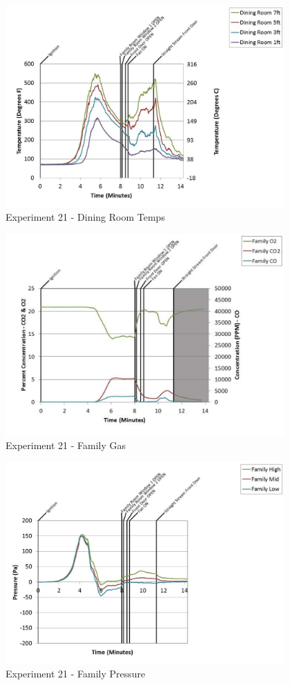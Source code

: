 \documentclass{article}
\begin{document}
\begin{appendices}
	\clearpage

	\begin{figure}[h!]
		\centering
		\includegraphics[height=3.05in]{0_Images/Results_Charts/Exp_21_Charts/DiningRoomTemps.pdf}
		\caption{Experiment 21 - Dining Room Temps}
	\end{figure}
 

	\begin{figure}[h!]
		\centering
		\includegraphics[height=3.05in]{0_Images/Results_Charts/Exp_21_Charts/FamilyGas.pdf}
		\caption{Experiment 21 - Family Gas}
	\end{figure}
 
	\clearpage

	\begin{figure}[h!]
		\centering
		\includegraphics[height=3.05in]{0_Images/Results_Charts/Exp_21_Charts/FamilyPressure.pdf}
		\caption{Experiment 21 - Family Pressure}
	\end{figure}
 


\end{appendices}
\end{document}

